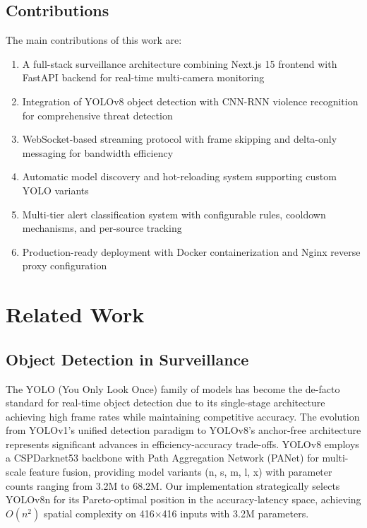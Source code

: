 \documentclass[conference]{IEEEtran}
\begin{document}
\subsection{Contributions}
The main contributions of this work are:
\begin{enumerate}
    \item A full-stack surveillance architecture combining Next.js 15 frontend with FastAPI backend for real-time multi-camera monitoring
    \item Integration of YOLOv8 object detection with CNN-RNN violence recognition for comprehensive threat detection
    \item WebSocket-based streaming protocol with frame skipping and delta-only messaging for bandwidth efficiency
    \item Automatic model discovery and hot-reloading system supporting custom YOLO variants
    \item Multi-tier alert classification system with configurable rules, cooldown mechanisms, and per-source tracking
    \item Production-ready deployment with Docker containerization and Nginx reverse proxy configuration
\end{enumerate}

\section{Related Work}

\subsection{Object Detection in Surveillance}
The YOLO (You Only Look Once) family of models has become the de-facto standard for real-time object detection due to its single-stage architecture achieving high frame rates while maintaining competitive accuracy. The evolution from YOLOv1's unified detection paradigm \cite{yolo-original} to YOLOv8's anchor-free architecture \cite{yolov8} represents significant advances in efficiency-accuracy trade-offs. YOLOv8 employs a CSPDarknet53 backbone with Path Aggregation Network (PANet) for multi-scale feature fusion, providing model variants (n, s, m, l, x) with parameter counts ranging from 3.2M to 68.2M. Our implementation strategically selects YOLOv8n for its Pareto-optimal position in the accuracy-latency space, achieving $O(n^2)$ spatial complexity on 416×416 inputs with 3.2M parameters.
\end{document}
